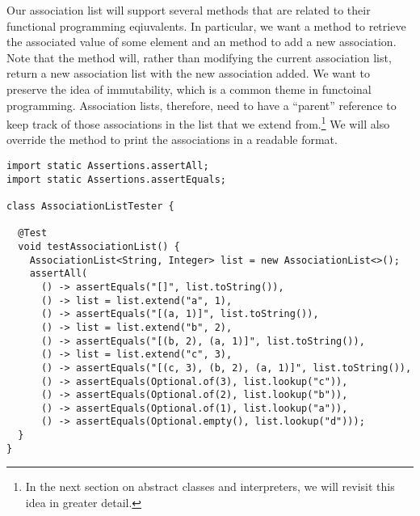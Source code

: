Our association list will support several methods that are related to their functional programming eqiuvalents. 
In particular, we want a  method to retrieve the associated value of some element and an  method to add a new association. 
Note that the  method will, rather than modifying the current association list, return a new association list with the new association added. 
We want to preserve the idea of immutability, which is a common theme in functoinal programming.
Association lists, therefore, need to have a ``parent'' reference to keep track of those associations in the list that we extend from.\footnote{In the next section on abstract classes and interpreters, we will revisit this idea in greater detail.} 
We will also override the  method to print the associations in a readable format. 

\begin{lstlisting}[language=MyJava]
import static Assertions.assertAll;
import static Assertions.assertEquals;

class AssociationListTester {

  @Test
  void testAssociationList() {
    AssociationList<String, Integer> list = new AssociationList<>();
    assertAll(
      () -> assertEquals("[]", list.toString()),
      () -> list = list.extend("a", 1),
      () -> assertEquals("[(a, 1)]", list.toString()),
      () -> list = list.extend("b", 2),
      () -> assertEquals("[(b, 2), (a, 1)]", list.toString()),
      () -> list = list.extend("c", 3),
      () -> assertEquals("[(c, 3), (b, 2), (a, 1)]", list.toString()),
      () -> assertEquals(Optional.of(3), list.lookup("c")),
      () -> assertEquals(Optional.of(2), list.lookup("b")),
      () -> assertEquals(Optional.of(1), list.lookup("a")),
      () -> assertEquals(Optional.empty(), list.lookup("d")));
  }
}
\end{lstlisting}

